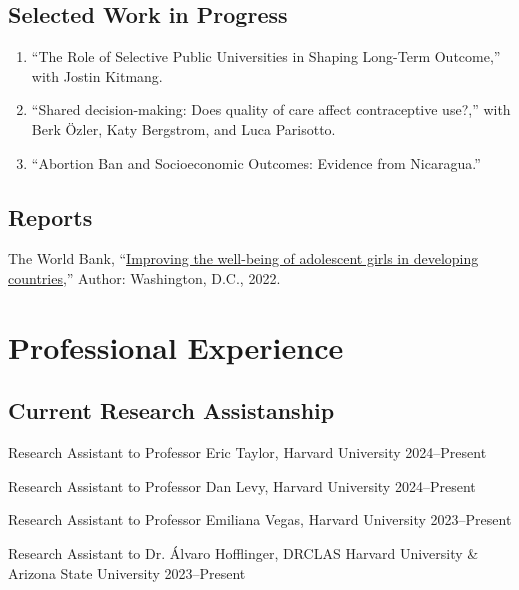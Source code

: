 \documentclass[a4paper, 10pt]{article}
\renewenvironment{itemize}{
  \begin{list}{}
    { \setlength{\itemsep}{5pt}
      \setlength{\parsep}{0pt}
      \setlength{\topsep}{0pt}
      \setlength{\leftmargin}{0em} } }{
  \end{list}}
\begin{document}
\subsection*{Selected Work in Progress}

\begin{enumerate}[leftmargin=10pt, label={}, itemindent=-10pt, nosep]
\item ``The Role of Selective Public Universities in Shaping Long-Term
Outcome,'' with Jostin Kitmang. 
\item ``Shared decision-making: Does quality of care affect contraceptive
use?,'' with Berk Özler, Katy Bergstrom, and Luca Parisotto.
  \item ``Abortion Ban and Socioeconomic Outcomes: Evidence from Nicaragua.''
\end{enumerate}

\subsection*{Reports}

\begin{itemize}
\item The World Bank,
``\href{https://documents1.worldbank.org/curated/en/099025312242111019/pdf/P1699940bcc13001a083820804f74e8151b.pdf}{Improving
the well-being of adolescent girls in developing countries},'' Author:
Washington, D.C., 2022. 
\end{itemize}


\section*{Professional Experience}

\subsection*{Current Research Assistanship}

\begin{itemize}
  \item Research Assistant to Professor Eric Taylor, Harvard University 
  \hfill 2024--Present 
  \item Research Assistant to Professor Dan Levy, Harvard University
  \hfill 2024--Present
  \item Research Assistant to Professor Emiliana Vegas, Harvard University
  \hfill 2023--Present
  \item Research Assistant to Dr. Álvaro Hofflinger, DRCLAS Harvard University
  \& Arizona State University
  \hfill 2023--Present
\end{itemize}
\end{document}
